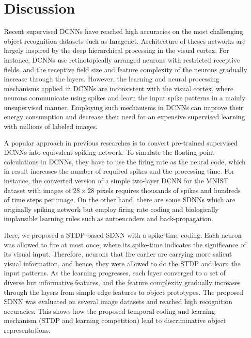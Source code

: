 \documentclass[preprint,5p,12pt,twocolumn]{article}
\begin{document}
\section*{Discussion}
Recent supervised DCNNs have reached high accuracies on the most challenging object recognition datasets such as Imagenet. Architecture of theses networks are largely inspired by the deep hierarchical processing in the visual cortex. For instance, DCNNs  use retinotopically arranged neurons with restricted receptive fields, and the receptive field size and feature complexity of the neurons gradually increase through the layers. However, the learning and neural processing mechanisms applied in DCNNs are inconsistent with the visual cortex, where neurons communicate using spikes and learn the input spike patterns in a mainly unsupervised manner. Employing such mechanisms in DCNNs can improve their energy consumption and decrease their need for an expensive supervised learning with millions of labeled images.

A popular approach in previous researches is to convert pre-trained supervised DCNNs into equivalent spiking network. To simulate the floating-point calculations in DCNNs, they  have to use the firing rate as the neural code, which in result increases the number of required spikes and the processing time. For instance, the converted version of a simple two-layer DCNN for the MNIST dataset with images of $28 \times 28$ pixels requires thousands of spikes and hundreds of time steps per image. On the other hand, there are some SDNNs \cite{panda2016unsupervised,burbank2015mirrored,bengio2015towards} which are originally spiking network but employ firing rate coding and  biologically implausible learning rules such as autoencoders and back-propagation.

Here, we proposed a STDP-based SDNN with a spike-time coding. Each neuron was allowed to fire at most once, where its spike-time indicates the significance of its visual input. Therefore, neurons that fire earlier are carrying more salient visual information, and hence, they were allowed to do the STDP and learn the input patterns. As the learning progresses, each layer converged to a set of diverse but informative features, and the feature complexity gradually increases through the layers from simple edge features to object prototypes. The proposed SDNN was evaluated on several image datasets and reached high recognition accuracies. This shows how the proposed temporal coding and learning mechanism (STDP and learning competition) lead to  discriminative object representations.
\end{document}
